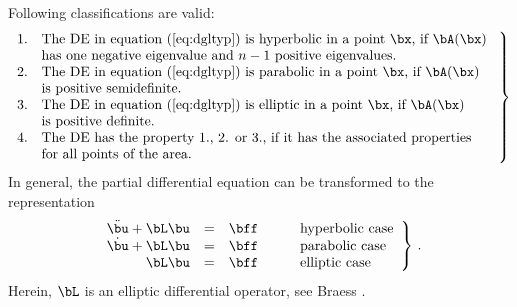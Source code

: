 Following classifications are valid:
%
\begin{eqnarray}
\left. 
\begin{array}{ll}
1. & \textnormal{The DE in equation (\ref{eq:dgltyp}) 
                 is hyperbolic in a point $\bx$, if $\bA(\bx)$ } \\
   & \textnormal{has one negative eigenvalue and $n-1$ 
                 positive eigenvalues.} \\
2. & \textnormal{The DE in equation (\ref{eq:dgltyp}) 
                 is parabolic in a  point $\bx$, if $\bA(\bx)$ } \\
   & \textnormal{is positive semidefinite.} \\
3. & \textnormal{The DE in equation (\ref{eq:dgltyp}) 
								is elliptic in a point $\bx$, if $\bA(\bx)$} \\
   & \textnormal{is positive definite.} \\
4. & \textnormal{The DE has the property 1., 2. or 3., 
                 if it has the associated properties  } \\
   & \textnormal{for all points of the area.} \\
\end{array}
\right\}
\end{eqnarray}
%	
In general, the partial differential equation can be
transformed to the representation
%
\begin{equation}
\left. 
\begin{array}{rclccl}
\ddot{\bu} + \bL \bu & = & \bff &&& \textnormal{hyperbolic case} \\
\dot{\bu} + \bL \bu  & = & \bff &&& \textnormal{parabolic case}\\ 
             \bL \bu & = & \bff &&& \textnormal{elliptic case} 
\end{array}
\right\} \, . 
\end{equation}
%
Herein, $\bL$ is an elliptic differential operator, 
see {\sc Braess} \cite{Bra:1992:fe}.
